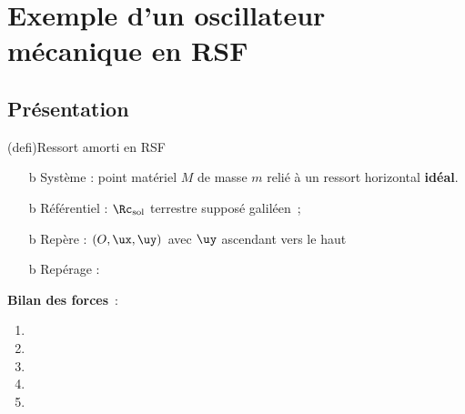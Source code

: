 \documentclass[../../main/main.tex]{subfiles}
\begin{document}
\section{Exemple d'un oscillateur mécanique en RSF}
\subsection{Présentation}
\begin{tcb*}(defi){Ressort amorti en RSF}
	\begin{itemize}
		\item[b]{Système} : point matériel $M$ de masse $m$ relié à un ressort
		      horizontal \textbf{idéal}.
		\item[b]{Référentiel} : $\Rc_{\rm sol}$ terrestre supposé galiléen~;
		\item[b]{Repère} : $(O,\ux,\uy)$ avec $\uy$ ascendant vers le haut
		\item[b]{Repérage} :
		      \psw{%
			      \[
				      \OM(t) = \ell(t) \ux~;
				      \vf(t) = \lp(t)\ux~;
				      \af(t) = \lpp(t)\ux
			      \]
		      }%
	\end{itemize}
	\vspace{-25pt}
	\begin{isd}[righthand ratio=.45]
		\textbf{Bilan des forces}~:
		\begin{enumerate}
			\item {}%
			\item {}%
			\item {}%
			\item {}%
			\item {}%
		\end{enumerate}
		\tcblower
		\begin{center}
\end{center}
\end{isd}
\end{tcb*}
\end{document}
